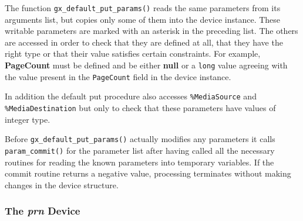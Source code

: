 \documentclass[twoside,a4paper]{article}
\newcommand{\ps}[1]{{\sffamily\bfseries #1}}	%
\newcommand{\prog}[1]{\texttt{#1}}
\begin{document}
The function \prog{gx\_default\_put\_params()} reads the same parameters from
its arguments list,
but copies only some of them into the device instance.
These writable parameters are marked with an asterisk in the preceding list.
The others are accessed in order to check that they are defined at all,
that they have the right type or that their value satisfies certain constraints.
For example,
\ps{PageCount} must be defined and
be either \ps{null} or a \prog{long} value agreeing with the value present
in the \prog{PageCount} field in the device instance.

In addition the default put procedure also accesses \prog{\%MediaSource} and
\prog{\%MediaDestination} but only to check that these parameters have values
of integer type.

Before \prog{gx\_default\_put\_params()} actually modifies any parameters it
calls \prog{param\_commit()} for the parameter list after having called all
the necessary routines for reading the known parameters
into temporary variables.
If the commit routine returns a negative value,
processing terminates without making changes in the device structure.


\subsubsection{The \textit{prn\/} Device}
\end{document}
